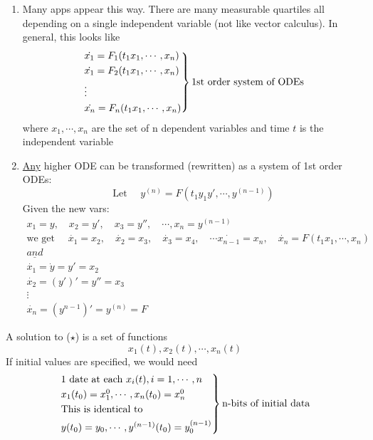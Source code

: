 \begin{enumerate}[label=\protect\circled{\arabic*}]
	\item Many apps appear this way. There are many measurable quartiles all depending on a single independent variable (not like vector calculus). In general, this looks like
	\begin{gather*}
		\begin{rcases}
			\dot{x_1} = F_1(t_1x_1, \cdots, x_n)\\
			\dot{x_1} = F_2(t_1x_1, \cdots, x_n)\\
			\vdots\\
			\dot{x_n} = F_n(t_1x_1, \cdots, x_n)\\
		\end{rcases}
		\text{1st order system of ODEs}
	\end{gather*}
	where $x_1, \cdots, x_n$ are the set of n dependent variables and time $t$ is the independent variable
	\item \underline{Any} higher ODE can be transformed (rewritten) as a system of 1st order ODEs:
	\begin{equation*}
		\text{Let } \quad y^{(n)} = F(t_1y_1y', \cdots, y^{(n-1)})
	\end{equation*}
	Given the new vars:
	\begin{gather*}
		x_1 = y, \quad x_2 = y', \quad x_3 = y'', \quad \cdots, x_n = y^{(n-1)}\\
		\text{we get } \quad \dot{x_1} = x_2, \quad \dot{x_2} = x_3, \quad \dot{x_3} = x_4, \quad \cdots \dot{x_{n-1}} = x_n, \quad \dot{x_n} = F(t_1x_1, \cdots, x_n)\\
		\underline{and} \\
		\dot{x_1} = \dot{y} = y' = x_2\\
		\dot{x_2} = (y')' = y''= x_3\\
		\vdots\\
		\dot{x_n} = (y^{n-1})' = y^{(n)} = F
	\end{gather*}
\end{enumerate}
A solution to ($\star$) is a set of functions
\begin{equation*}
	x_1(t), x_2(t), \cdots, x_n(t)
\end{equation*}
If initial values are specified, we would need 
\begin{gather*}
	\begin{rcases}
		\text{1 date at each } x_i(t), i = 1, \cdots, n\\
		x_1(t_0) = x_1^0, \cdots, x_n(t_0) = x_n^0\\
		\text{This is identical to }\\
		y(t_0) = y_0, \cdots, y^{(n-1)}(t_0) = y_0^{(n-1)}
	\end{rcases} \text{n-bits of initial data}
\end{gather*}
